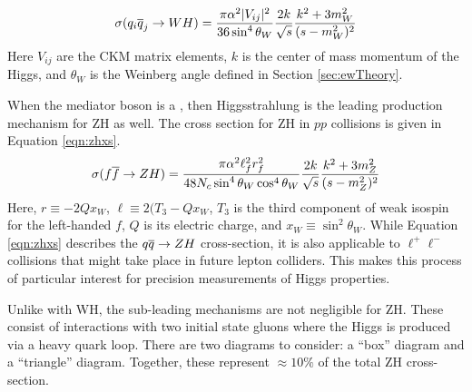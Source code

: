 \begin{equation}\begin{split}\label{eqn:whxs}
\sigma(q_i\overline{q}_j\to WH)=\frac{\pi\alpha^2 |V_{ij}|^2}{36 \sin^4\theta_W} \frac{2k}{\sqrt{s}} \frac{k^2+3m^2_W}{(s-m^2_W)^2}
\end{split}\end{equation} 
Here $V_{ij}$ are the CKM matrix elements, $k$ is the center of mass momentum of the Higgs, and $\theta_W$ is the Weinberg angle defined in Section \ref{sec:ewTheory}.

When the mediator boson is a \Z, then Higgsstrahlung is the leading production mechanism for ZH as well.
The cross section for ZH in $pp$ collisions is given in Equation \ref{eqn:zhxs}.
\begin{equation}\begin{split}\label{eqn:zhxs}
\sigma(f\overline{f}\to ZH)=\frac{\pi\alpha^2 \ell_f^2r_f^2}{48N_c\sin^4\theta_W\cos^4\theta_W} \frac{2k}{\sqrt{s}} \frac{k^2+3m^2_Z}{(s-m^2_Z)^2}
\end{split}\end{equation} 
Here, $r\equiv-2Qx_W$, $\ell\equiv2(T_3-Qx_W$,
$T_3$ is the third component of weak isospin for the left-handed $f$, $Q$ is its electric charge, and $x_W\equiv\sin^2\theta_W$.
While Equation \ref{eqn:zhxs} describes the $q\overline{q}\to ZH$ cross-section, it is also applicable to $\ell^+\ell^-$ collisions that might take place in future lepton colliders.
This makes this process of particular interest for precision measurements of Higgs properties.

Unlike with WH, the sub-leading mechanisms are not negligible for ZH.
These consist of interactions with two initial state gluons where the Higgs is produced via a heavy quark loop.
There are two diagrams to consider: a ``box'' diagram and a ``triangle'' diagram.
Together, these represent $\approx10\%$ of the total ZH cross-section.

